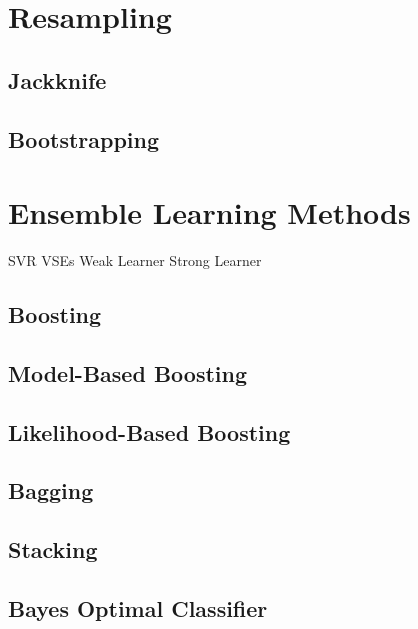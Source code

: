 \section{Resampling}
\subsection{Jackknife}
\subsection{Bootstrapping}

\section{Ensemble Learning Methods}
SVR
VSEs
Weak Learner
Strong Learner
\subsection{Boosting}
\subsection{Model-Based Boosting}
\subsection{Likelihood-Based Boosting}
\subsection{Bagging}
\subsection{Stacking}
\subsection{Bayes Optimal Classifier}
